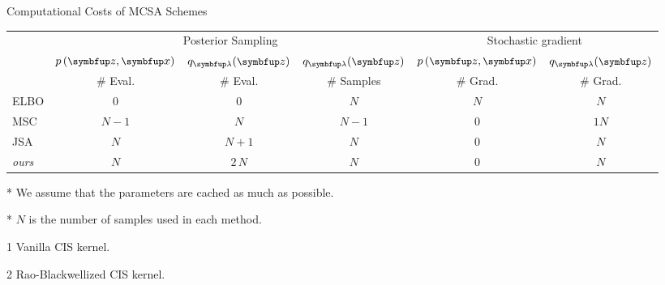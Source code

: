 
\caption{Computational Costs of MCSA Schemes}\label{table:cost}
  \vspace{-0.05in}
\setlength{\tabcolsep}{2pt}
  \begin{threeparttable}
\begin{tabular}{lccccc}\toprule
& \multicolumn{3}{c}{\footnotesize Posterior Sampling} & \multicolumn{2}{c}{\footnotesize Stochastic gradient} \\
\cmidrule(lr){2-4}\cmidrule(lr){5-6}
  & \(\footnotesize p\left( \vz, \vx \right)\)
  & \(\footnotesize q_{\vlambda}(\vz)\)
  & \(\footnotesize q_{\vlambda}(\vz)\)
  & \(\footnotesize p\left( \vz, \vx \right)\)
  & \(\footnotesize q_{\vlambda}(\vz)\)
  \\
  & {\footnotesize\# Eval.  }
  & {\footnotesize\# Eval.  }
  & {\footnotesize\# Samples}
  & {\footnotesize\# Grad.  }
  & {\footnotesize\# Grad.  }
%
\\\midrule
%
{\footnotesize
ELBO
}
& \(0\)
& \(0\)
& \(N\)
& \(N\)
& \(N\)
\\\arrayrulecolor{black!30}\midrule
%
{\footnotesize
MSC
}
& \(N-1\)
& \(N\)
& \(N-1\)
& \(0\)
& \(1\)\tnote{1}\;\;{\footnotesize or}\;\(N\)\tnote{2}
\\
%
{\footnotesize
JSA
}
& \(N\)
& \(N+1\)
& \(N\)
& \(0\)
& \(N\)
\\
%
{\footnotesize
\textit{ours}
}
& \(N\)
& \(2 \, N\)
& \(N\)
& \(0\)
& \(N\)
\\\bottomrule
\end{tabular}
  \begin{tablenotes}
    \item[*]{\footnotesize We assume that the parameters are cached as much as possible}.
    \item[*]{\footnotesize \(N\) is the number of samples used in each method}.
    \item[1]{\footnotesize Vanilla CIS kernel}.
    \item[2]{\footnotesize Rao-Blackwellized CIS kernel}.
  \end{tablenotes}
  \end{threeparttable}
